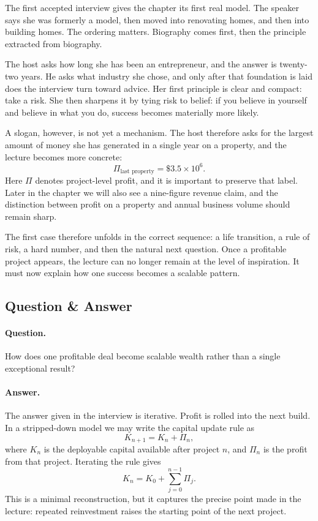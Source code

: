 The first accepted interview gives the chapter its first real model. The speaker says she was formerly a model, then moved into renovating homes, and then into building homes. The ordering matters. Biography comes first, then the principle extracted from biography.

The host asks how long she has been an entrepreneur, and the answer is twenty-two years. He asks what industry she chose, and only after that foundation is laid does the interview turn toward advice. Her first principle is clear and compact: take a risk. She then sharpens it by tying risk to belief: if you believe in yourself and believe in what you do, success becomes materially more likely.

A slogan, however, is not yet a mechanism. The host therefore asks for the largest amount of money she has generated in a single year on a property, and the lecture becomes more concrete:
\begin{equation}
\Pi_{\text{last property}} = \$3.5\times 10^6.
\end{equation}
Here \(\Pi\) denotes project-level profit, and it is important to preserve that label. Later in the chapter we will also see a nine-figure revenue claim, and the distinction between profit on a property and annual business volume should remain sharp.

The first case therefore unfolds in the correct sequence: a life transition, a rule of risk, a hard number, and then the natural next question. Once a profitable project appears, the lecture can no longer remain at the level of inspiration. It must now explain how one success becomes a scalable pattern.

\subsection{Question \& Answer}

\paragraph{Question.} How does one profitable deal become scalable wealth rather than a single exceptional result?

\paragraph{Answer.} The answer given in the interview is iterative. Profit is rolled into the next build. In a stripped-down model we may write the capital update rule as
\begin{equation}
K_{n+1} = K_n + \Pi_n,
\end{equation}
where \(K_n\) is the deployable capital available after project \(n\), and \(\Pi_n\) is the profit from that project. Iterating the rule gives
\begin{equation}
K_n = K_0 + \sum_{j=0}^{n-1}\Pi_j.
\end{equation}
This is a minimal reconstruction, but it captures the precise point made in the lecture: repeated reinvestment raises the starting point of the next project.

